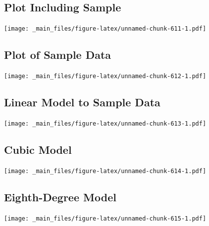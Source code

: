 \documentclass[]{book}
\newenvironment{Shaded}{\begin{snugshade}}{\end{snugshade}}
\newcommand{\KeywordTok}[1]{\textcolor[rgb]{0.13,0.29,0.53}{\textbf{#1}}}
\newcommand{\DecValTok}[1]{\textcolor[rgb]{0.00,0.00,0.81}{#1}}
\newcommand{\StringTok}[1]{\textcolor[rgb]{0.31,0.60,0.02}{#1}}
\newcommand{\OperatorTok}[1]{\textcolor[rgb]{0.81,0.36,0.00}{\textbf{#1}}}
\newcommand{\NormalTok}[1]{#1}
\begin{document}
\begin{Shaded}
\end{Shaded}

\subsection{Plot Including Sample}\label{plot-including-sample}

\texttt{[image: \_main\_files/figure-latex/unnamed-chunk-611-1.pdf]}

\subsection{Plot of Sample Data}\label{plot-of-sample-data}

\texttt{[image: \_main\_files/figure-latex/unnamed-chunk-612-1.pdf]}

\subsection{Linear Model to Sample
Data}\label{linear-model-to-sample-data}

\texttt{[image: \_main\_files/figure-latex/unnamed-chunk-613-1.pdf]}

\subsection{Cubic Model}\label{cubic-model}

\texttt{[image: \_main\_files/figure-latex/unnamed-chunk-614-1.pdf]}

\subsection{Eighth-Degree Model}\label{eighth-degree-model}

\texttt{[image: \_main\_files/figure-latex/unnamed-chunk-615-1.pdf]}
\end{document}
